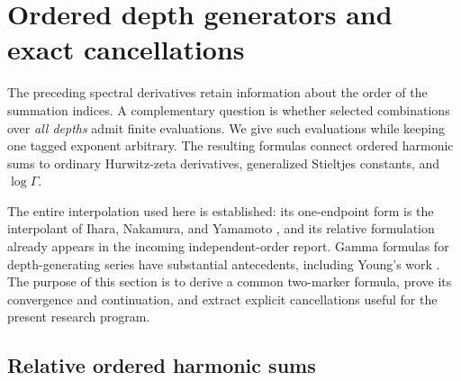 \section{Ordered depth generators and exact cancellations}
\label{sec:ordered}

The preceding spectral derivatives retain information about the order of
the summation indices.  A complementary question is whether selected
combinations over \emph{all depths} admit finite evaluations.  We give
such evaluations while keeping one tagged exponent arbitrary.  The
resulting formulas connect ordered harmonic sums to ordinary Hurwitz-zeta
derivatives, generalized Stieltjes constants, and $\log\Gamma$.

The entire interpolation used here is established: its one-endpoint
form is the interpolant of Ihara, Nakamura, and Yamamoto
\cite{INY}, and its relative formulation already appears in the
incoming independent-order report.  Gamma formulas for depth-generating
series have substantial antecedents, including Young's work
\cite{Young}.  The purpose of this section is to derive a common
two-marker formula, prove its convergence and continuation, and extract
explicit cancellations useful for the present research program.

\subsection{Relative ordered harmonic sums}

